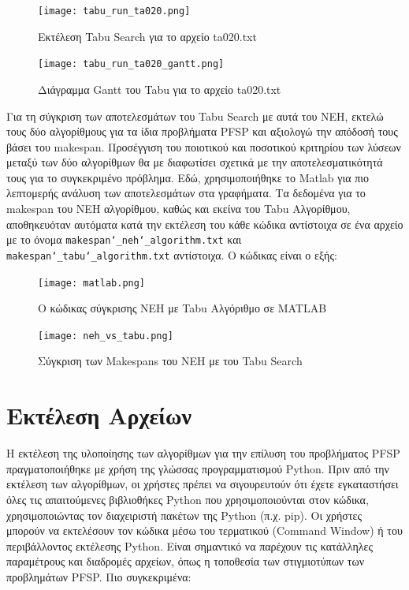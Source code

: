 \documentclass[paper=a4, fontsize=11pt]{scrartcl}
\numberwithin{equation}{section}		%
\numberwithin{figure}{section}			%
\numberwithin{table}{section}				%
\begin{document}
\begin{figure}[H]
   \centering
   \texttt{[image: tabu\_run\_ta020.png]}
   \caption{Εκτέλεση Tabu Search  για το αρχείο ta020.txt}
   \label{fig:tabu_ta020}
\end{figure} 

\begin{figure}[H]
   \centering
   \texttt{[image: tabu\_run\_ta020\_gantt.png]}
   \caption{Διάγραμμα Gantt του Tabu  για το αρχείο ta020.txt}
   \label{fig:tabu_ta001}
\end{figure}
    
    Για τη σύγκριση των αποτελεσμάτων του Tabu Search με αυτά του NEH, εκτελώ τους δύο αλγορίθμους για τα ίδια προβλήματα PFSP και αξιολογώ την απόδοσή τους βάσει του makespan. Προσέγγιση του ποιοτικού και ποσοτικού κριτηρίου των λύσεων μεταξύ των δύο αλγορίθμων θα με διαφωτίσει σχετικά με την αποτελεσματικότητά τους για το συγκεκριμένο πρόβλημα. Εδώ, χρησιμοποιήθηκε το Matlab για πιο λεπτομερής ανάλυση των αποτελεσμάτων στα γραφήματα. Τα δεδομένα για το makespan του NEH αλγορίθμου, καθώς και εκείνα του Tabu Αλγορίθμου, αποθηκευόταν αυτόματα κατά την εκτέλεση του κάθε κώδικα αντίστοιχα σε ένα αρχείο με το όνομα \texttt{makespan\char`_neh\char`_algorithm.txt} και \texttt{makespan\char`_tabu\char`_algorithm.txt} αντίστοιχα. Ο κώδικας είναι ο εξής:

\begin{figure}[H]
   \centering
   \texttt{[image: matlab.png]}
   \caption{Ο κώδικας σύγκρισης NEH με Tabu Αλγόριθμο σε MATLAB}
   \label{fig:matlabcode}
\end{figure} 

\begin{figure}[H]
   \centering
   \texttt{[image: neh\_vs\_tabu.png]}
   \caption{Σύγκριση των Makespans του NEH με του Tabu Search}
   \label{fig:matlabplot}
\end{figure} 

\newpage
\section{Εκτέλεση Αρχείων}

    Η εκτέλεση της υλοποίησης των αλγορίθμων για την επίλυση του προβλήματος PFSP πραγματοποιήθηκε με χρήση της γλώσσας προγραμματισμού Python. Πριν από την εκτέλεση των αλγορίθμων, οι χρήστες πρέπει να σιγουρευτούν ότι έχετε εγκαταστήσει όλες τις απαιτούμενες βιβλιοθήκες Python που χρησιμοποιούνται στον κώδικα, χρησιμοποιώντας τον διαχειριστή πακέτων της Python (π.χ. pip).
    Οι χρήστες μπορούν να εκτελέσουν τον κώδικα μέσω του τερματικού (Command Window) ή του περιβάλλοντος εκτέλεσης Python. Είναι σημαντικό να παρέχουν τις κατάλληλες παραμέτρους και διαδρομές αρχείων, όπως η τοποθεσία των στιγμιοτύπων των προβλημάτων PFSP. Πιο συγκεκριμένα:
\end{document}
